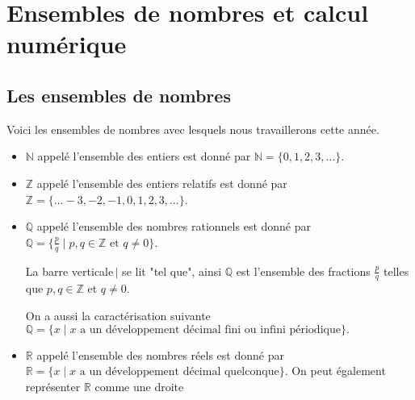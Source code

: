 \documentclass[a4paper,12pt]{report}
\begin{document}
\chapter{Ensembles de nombres et calcul numérique}
\thispagestyle{fancy}
\section{Les ensembles de nombres}
Voici les ensembles de nombres avec lesquels nous travaillerons cette année. 
\begin{itemize}
	\item $\mathbb{N}$ appelé l'ensemble des entiers est donné par $\mathbb{N}=\{0,1,2,3,\ldots\}$.
	\item $\mathbb{Z}$ appelé l'ensemble des entiers relatifs est donné par $\mathbb{Z}=\{\ldots -3,-2,-1,0,1,2,3,\ldots\}$.
	\item $\mathbb{Q}$ appelé l'ensemble des nombres rationnels est donné par $\mathbb{Q}=\{\frac{p}{q} \mid p,q\in \mathbb{Z} \text{ et } q\neq 0 \}$. 
	
	La barre verticale\,$\mid$ se lit "tel que", ainsi $\mathbb{Q}$ est l'ensemble des fractions $\frac{p}{q}$ telles que $p,q \in \mathbb Z$ et $q\neq 0$.

	On a aussi la caractérisation suivante $\mathbb Q=\{x \mid x \text{ a un développement décimal fini ou infini périodique}\}.$
	\item $\mathbb{R}$ appelé l'ensemble des nombres réels est donné par $\mathbb R=\{x \mid x \text{ a un développement décimal quelconque}\}$.
	On peut également représenter $\mathbb{R}$ comme une droite 
	\begin{center}
\end{center}
\end{itemize}
\end{document}

